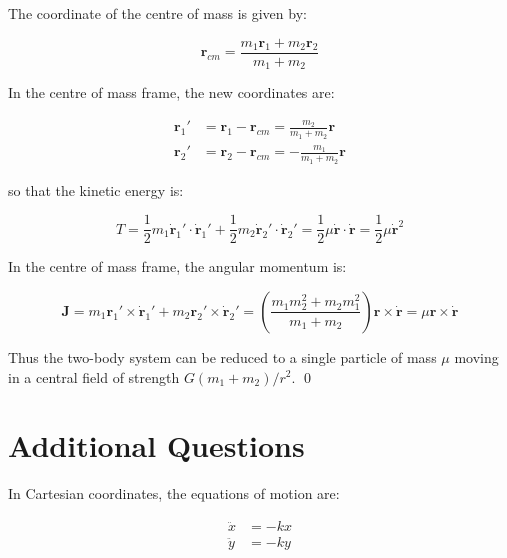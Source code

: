 \documentclass[12pt]{article}
\begin{document}
The coordinate of the centre of mass is given by:

\begin{equation}
    \mathbf{r}_{cm} = \frac{m_{1}\mathbf{r}_{1} + m_{2}\mathbf{r}_{2}}{m_{1} + m_{2}}
\end{equation}

In the centre of mass frame, the new coordinates are:

\begin{equation}
\begin{split}
    \mathbf{r}_{1}' &= \mathbf{r}_{1} - \mathbf{r}_{cm} = \frac{m_{2}}{m_{1} + m_{2}} \mathbf{r} \\
    \mathbf{r}_{2}' &= \mathbf{r}_{2} - \mathbf{r}_{cm} = -\frac{m_{1}}{m_{1} + m_{2}} \mathbf{r}
\end{split}
\end{equation}

so that the kinetic energy is:

\begin{equation}
    T = \frac{1}{2} m_{1} \dot{\mathbf{r}}_{1}' \cdot \dot{\mathbf{r}}_{1}' + \frac{1}{2} m_{2} \dot{\mathbf{r}}_{2}' \cdot \dot{\mathbf{r}}_{2}' = \frac{1}{2} \mu \dot{\mathbf{r}} \cdot \dot{\mathbf{r}} = \frac{1}{2} \mu \dot{\mathbf{r}}^{2}
\end{equation}

In the centre of mass frame, the angular momentum is:

\begin{equation}
    \mathbf{J} = m_{1} \mathbf{r}_{1}' \times \dot{\mathbf{r}}_{1}' + m_{2} \mathbf{r}_{2}' \times \dot{\mathbf{r}}_{2}' = \left( \frac{m_{1}m_{2}^{2} + m_{2}m_{1}^{2}}{m_{1} + m_{2}} \right) \mathbf{r} \times \dot{\mathbf{r}} = \mu \mathbf{r} \times \dot{\mathbf{r}}
\end{equation}

Thus the two-body system can be reduced to a single particle of mass $\mu$ moving in a central field of strength $G(m_{1} + m_{2})/r^{2}$.
\qed


\pagebreak
\section*{Additional Questions}



In Cartesian coordinates, the equations of motion are:

\begin{equation}
\begin{split}
    \ddot{x} &= -kx \\
    \ddot{y} &= -ky
\end{split}
\end{equation}
\end{document}
